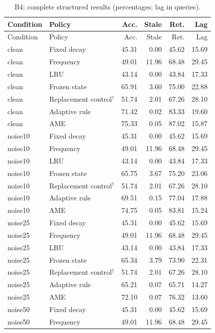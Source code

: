 \begin{longtable}{llrrrr}\caption{B4: complete structured results (percentages; lag in queries).}\label{tab:B4}\\\toprule Condition & Policy & Acc. & Stale & Ret. & Lag\\\midrule\endfirsthead\toprule Condition & Policy & Acc. & Stale & Ret. & Lag\\\midrule\endhead
clean & Fixed decay & 45.31 & 0.00 & 45.62 & 15.69\\
clean & Frequency & 49.01 & 11.96 & 68.48 & 29.45\\
clean & LRU & 43.14 & 0.00 & 43.84 & 17.33\\
clean & Frozen state & 65.91 & 3.60 & 75.00 & 22.88\\
clean & Replacement control$^{\dagger}$ & 51.74 & 2.01 & 67.26 & 28.10\\
clean & Adaptive rule & 71.42 & 0.02 & 83.33 & 19.60\\
clean & AME & 75.33 & 0.05 & 87.02 & 15.87\\
noise10 & Fixed decay & 45.31 & 0.00 & 45.62 & 15.69\\
noise10 & Frequency & 49.01 & 11.96 & 68.48 & 29.45\\
noise10 & LRU & 43.14 & 0.00 & 43.84 & 17.33\\
noise10 & Frozen state & 65.75 & 3.67 & 75.20 & 23.06\\
noise10 & Replacement control$^{\dagger}$ & 51.74 & 2.01 & 67.26 & 28.10\\
noise10 & Adaptive rule & 69.51 & 0.15 & 77.04 & 17.88\\
noise10 & AME & 74.75 & 0.05 & 83.81 & 15.24\\
noise25 & Fixed decay & 45.31 & 0.00 & 45.62 & 15.69\\
noise25 & Frequency & 49.01 & 11.96 & 68.48 & 29.45\\
noise25 & LRU & 43.14 & 0.00 & 43.84 & 17.33\\
noise25 & Frozen state & 65.34 & 3.79 & 73.90 & 22.31\\
noise25 & Replacement control$^{\dagger}$ & 51.74 & 2.01 & 67.26 & 28.10\\
noise25 & Adaptive rule & 65.21 & 0.07 & 65.71 & 14.27\\
noise25 & AME & 72.10 & 0.07 & 76.32 & 13.60\\
noise50 & Fixed decay & 45.31 & 0.00 & 45.62 & 15.69\\
noise50 & Frequency & 49.01 & 11.96 & 68.48 & 29.45\\

\end{longtable}

